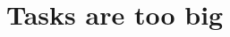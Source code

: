 \section{Tasks are too big}
\label{section:node-level:task-size-too-big}

% 
% 
% 
% 
% 
% 
% 
% 
% 
% 
% 
% 
% 
% 
